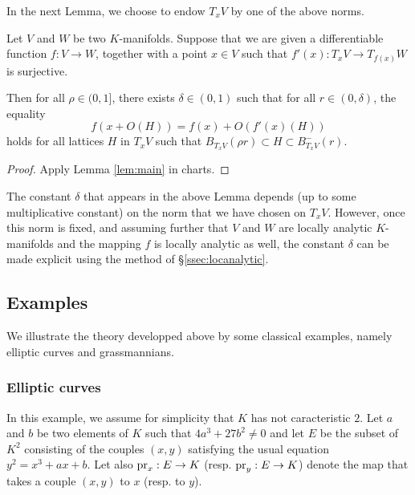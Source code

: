 \documentclass{lms}
\begin{document}
In the next Lemma, we choose to endow $T_x V$ by one of the above norms.

\begin{lem}
Let $V$ and $W$ be two $K$-manifolds. 
Suppose that we are given a differentiable function $f : V \to W$, 
together with a point $x \in V$ such that $f'(x) : T_x V \to T_{f(x)} W$ 
is surjective. 

Then for all $\rho \in (0,1]$, there exists $\delta \in (0,1)$ such 
that for all $r \in (0, \delta)$, the equality
$$f(x + O(H)) = f(x) + O(f'(x)(H))$$
holds for all lattices $H$ in $T_x V$ such that $B^{\phantom -}_{T_x V}(\rho r)
\subset H \subset B^-_{T_x V}(r)$.
\end{lem}

\begin{proof}
Apply Lemma \ref{lem:main} in charts.
\end{proof}

\begin{rmk}
The constant $\delta$ that appears in the above Lemma depends (up to
some multiplicative constant) on the norm that we have chosen on $T_x V$. 
However, once this norm is fixed, and assuming further that $V$ and $W$ 
are locally analytic $K$-manifolds and the mapping $f$ is locally 
analytic as well, the constant $\delta$ can be made explicit using the 
method of \S \ref{ssec:locanalytic}.
\end{rmk}

\subsection{Examples}
\label{ssec:exmanifold}

We illustrate the theory developped above by some classical examples,
namely elliptic curves and grassmannians.

\subsubsection*{Elliptic curves}

In this example, we assume for simplicity that $K$ has not caracteristic 
$2$. Let $a$ and $b$ be two elements of $K$ such that $4 a^3 + 27 b^2 
\neq 0$ and let $E$ be the subset of $K^2$ consisting of the couples 
$(x,y)$ satisfying the usual equation $y^2 = x^3 + a x + b$.
Let also $\text{\rm pr}_x : E \to K$ (resp. $\text{\rm pr}_y : E \to K$) denote the map that 
takes a couple $(x,y)$ to $x$ (resp. to $y$).

\medskip
\end{document}
